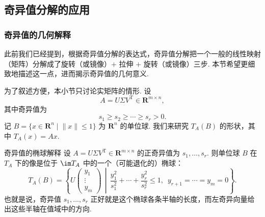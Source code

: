 \subsection{奇异值分解的应用}

\subsubsection*{奇异值的几何解释}

此前我们已经提到，根据奇异值分解的表达式，奇异值分解把一个一般的线性映射（矩阵）分解成了旋转（或镜像）$+$ 拉伸 $+$ 旋转（或镜像）三步. 本节希望更细致地描述这一点，进而揭示奇异值的几何意义.

为了叙述方便，本小节只讨论实矩阵的情形. 设
\[
    A = U\Sigma V^{\mathrm{T}} \in \mathbf{R}^{m \times n},
\]
其中奇异值为
\[
    s_1 \geqslant s_2 \geqslant \cdots \geqslant s_r > 0.
\]
记 $B = \{x \in \mathbf{R}^n \mid \lVert x \rVert \leqslant 1\}$ 为 $\mathbf{R}^n$ 的单位球. 我们来研究 $T_A(B)$ 的形状，其中 $T_A(x) = Ax$.

\begin{theorem}{}{奇异值的椭球解释}
    设 $A = U\Sigma V^{\mathrm{T}} \in \mathbf{R}^{m \times n}$ 的正奇异值为 $s_1, \ldots, s_r$. 则单位球 $B$ 在 $T_A$ 下的像是位于 $\im T_A$ 中的一个（可能退化的）椭球：
    \[
        T_A(B) =
        \left\{
            U
            \begin{pmatrix}
                y_1 \\
                \vdots \\
                y_m
            \end{pmatrix}
            \,\middle|\,
            \frac{y_1^2}{s_1^2} + \cdots + \frac{y_r^2}{s_r^2} \leqslant 1,\enspace
            y_{r+1} = \cdots = y_m = 0
        \right\}.
    \]
    也就是说，奇异值 $s_1, \ldots, s_r$ 正好就是这个椭球各条半轴的长度，而左奇异向量给出这些半轴在值域中的方向.
\end{theorem}

